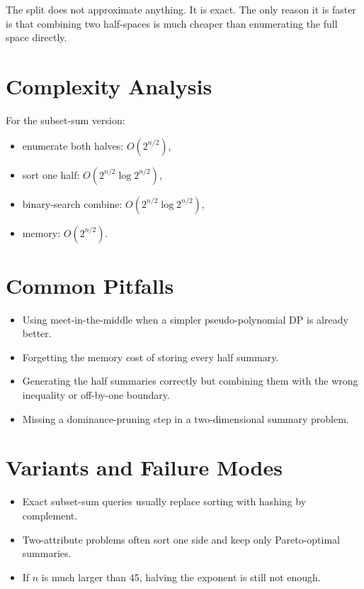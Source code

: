 The split does not approximate anything. It is exact. The only reason it is faster is that combining two half-spaces is
much cheaper than enumerating the full space directly.

\section*{Complexity Analysis}

For the subset-sum version:

\begin{itemize}
  \item enumerate both halves: \(O(2^{n/2})\),
  \item sort one half: \(O(2^{n/2}\log 2^{n/2})\),
  \item binary-search combine: \(O(2^{n/2}\log 2^{n/2})\),
  \item memory: \(O(2^{n/2})\).
\end{itemize}

\section*{Common Pitfalls}

\begin{itemize}
  \item Using meet-in-the-middle when a simpler pseudo-polynomial DP is already better.
  \item Forgetting the memory cost of storing every half summary.
  \item Generating the half summaries correctly but combining them with the wrong inequality or off-by-one boundary.
  \item Missing a dominance-pruning step in a two-dimensional summary problem.
\end{itemize}

\section*{Variants and Failure Modes}

\begin{itemize}
  \item Exact subset-sum queries usually replace sorting with hashing by complement.
  \item Two-attribute problems often sort one side and keep only Pareto-optimal summaries.
  \item If \(n\) is much larger than 45, halving the exponent is still not enough.
\end{itemize}

